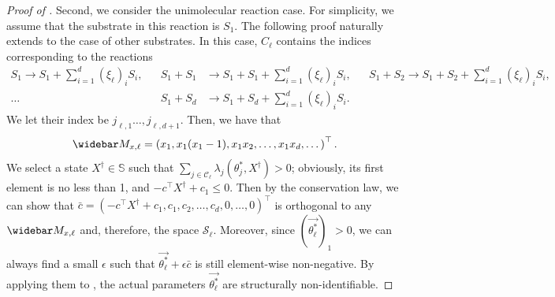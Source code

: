 \documentclass[pdflatex,sn-mathphys-num]{sn-jnl}%
\theoremstyle{thmstyleone}%
\theoremstyle{thmstyletwo}%
\theoremstyle{thmstylethree}%
\begin{document}
\begin{appendices}
\begin{proof}[Proof of ]
    Second, we consider the unimolecular reaction case. 
    For simplicity, we assume that the substrate in this reaction is $S_1$. 
    The following proof naturally extends to the case of other substrates. 
    In this case, $C_\ell$ contains the indices corresponding to the reactions 
    \begin{align*}
        S_1 \to S_1 + \sum_{i=1}^d (\xi_\ell)_i S_i, &&
        S_1+S_1 &\to S_1 + S_1+ \sum_{i=1}^d (\xi_\ell)_i S_i, &&
        S_1 + S_2 \to S_1 + S_2 + \sum_{i=1}^d (\xi_\ell)_i S_i, \\
         \dots \qquad\qquad
         &&
        S_1 + S_d &\to  S_1 + S_d + \sum_{i=1}^d (\xi_\ell)_i S_i.
    \end{align*}
    We let their index be $j_{\ell,1}\dots, j_{\ell,d+1}$. 
    Then, we have that 
    \begin{align*}
        \widebar M_{x,\ell} 
        = \left(x_1, x_1(x_1-1), x_1 x_2,\dots, x_1x_d, \dots\right)^{\top}.
    \end{align*}
    We select a state $X^\dagger\in\mathbb S$ such that  $\sum_{j\in\mathcal C_\ell}\lambda_{j}(\theta^*_j,X^\dagger) > 0$;
    obviously, its first element is no less than 1, and $-c^{\top} X^{\dagger} + c_1\leq 0$.
    Then by the conservation law, we can show that $\bar c = (-c^{\top} X^{\dagger} + c_1, c_1,c_2,\dots, c_d, 0,\dots, 0)^{\top}$ is orthogonal to any $\widebar M_{x,\ell} $ and, therefore, the space $\mathcal S_\ell$. 
    Moreover, since $\left(\overrightarrow {\theta^*_\ell}\right)_1>0$, we can always find a small $\epsilon$ such that $\overrightarrow {\theta^*_\ell}+\epsilon \bar c$ is still element-wise non-negative.
    By applying them to , the actual parameters $\overrightarrow {\theta^*_\ell}$ are structurally non-identifiable. 
\end{proof}

\end{appendices}
\end{document}
